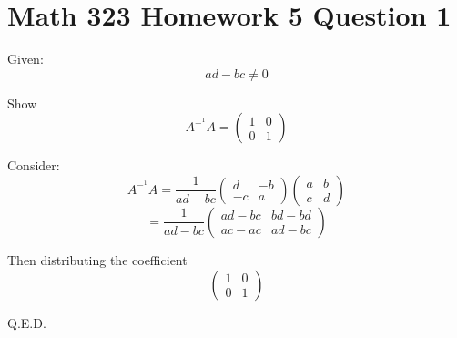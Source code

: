 \documentclass{article}
\author{Justin Steinberg}
\date{October 2021}
\begin{document}
\section{Math 323 Homework 5 Question 1}
Given: 
\begin{equation}
    ad-bc  \neq  0 
\end{equation}

Show
\begin{equation}
A^-^1A =   \begin{pmatrix}
1 & 0 \\
0 & 1
\end{pmatrix}
\end{equation}

Consider:
\begin{equation}
A^-^1A =  \frac{1}{ad-bc}  \begin{pmatrix}
d & -b \\
-c & a
\end{pmatrix} \begin{pmatrix}
a & b \\
c & d
\end{pmatrix}
\end{equation}
\begin{equation}
 = \frac{1}{ad-bc} \begin{pmatrix}
ad - bc & bd - bd \\
ac - ac & ad - bc
\end{pmatrix}
\end{equation}

Then distributing the coefficient
\begin{equation}
    \begin{pmatrix}
1 & 0 \\
0 & 1
\end{pmatrix}
\end{equation}

Q.E.D.
\end{document}
